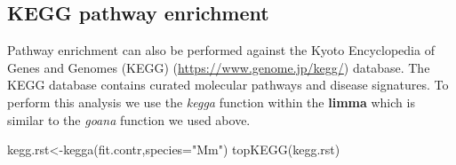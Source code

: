 \documentclass[
  openany]{book}
\newenvironment{Shaded}{\begin{snugshade}}{\end{snugshade}}
\newcommand{\AttributeTok}[1]{\textcolor[rgb]{0.77,0.63,0.00}{#1}}
\newcommand{\FunctionTok}[1]{\textcolor[rgb]{0.00,0.00,0.00}{#1}}
\newcommand{\NormalTok}[1]{#1}
\newcommand{\OtherTok}[1]{\textcolor[rgb]{0.56,0.35,0.01}{#1}}
\newcommand{\StringTok}[1]{\textcolor[rgb]{0.31,0.60,0.02}{#1}}
\begin{document}
\hypertarget{kegg-pathway-enrichment}{%
\subsection{KEGG pathway enrichment}\label{kegg-pathway-enrichment}}

Pathway enrichment can also be performed against the Kyoto Encyclopedia of Genes and Genomes (KEGG) (\url{https://www.genome.jp/kegg/}) database. The KEGG database contains curated molecular pathways and disease signatures. To perform this analysis we use the \emph{kegga} function within the \textbf{limma} which is similar to the \emph{goana} function we used above.

\begin{Shaded}
\begin{Highlighting}[]
\NormalTok{kegg.rst}\OtherTok{\textless{}{-}}\FunctionTok{kegga}\NormalTok{(fit.contr,}\AttributeTok{species=}\StringTok{"Mm"}\NormalTok{)}
\FunctionTok{topKEGG}\NormalTok{(kegg.rst)}
\end{Highlighting}
\end{Shaded}
\end{document}

